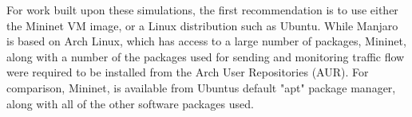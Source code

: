 For work built upon these simulations, the first recommendation is to use either
the Mininet VM image, or a Linux distribution such as Ubuntu. While Manjaro is
based on Arch Linux, which has access to a large number of packages, Mininet,
along with a number of the packages used for sending and monitoring traffic flow
were required to be installed from the Arch User Repositories (AUR). For
comparison, Mininet, is available from Ubuntus default "apt" package manager,
along with all of the other software packages used.
